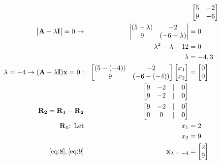 \documentclass{article}
\begin{document}
\begin{align}
    \label{eq:1}
    && &\text{ } \begin{bmatrix}
    5 & -2\\
    9 & -6
    \end{bmatrix}
    \\
    \label{eq:2}
    \begin{vmatrix} \textbf{A} - \lambda\textbf{I}\end{vmatrix}=0 \rightarrow && \begin{vmatrix}
    (5-\lambda) & -2\\
    9 & (-6-\lambda)
    \end{vmatrix} &= 0
    \\
    \label{eq:3}
    && \lambda ^2 -\lambda -12 &= 0
    \\
    \label{eq:4}
    && \lambda &= -4, 3
    \\
    \label{eq:5}
    \lambda = -4 \rightarrow (\textbf{A} - \lambda\textbf{I})\textbf{x}=0: &&
    \begin{bmatrix}
    (5-(-4)) & -2\\
    9 & (-6-(-4))
    \end{bmatrix}\begin{bmatrix}
    x_1\\x_2
    \end{bmatrix} &= \begin{bmatrix}
    0\\0
    \end{bmatrix}
    \\
    \label{eq:6}
    && \begin{bmatrix}
    9 & -2 &|& 0\\
    9 & -2 &|& 0
    \end{bmatrix}
    \\
    \label{eq:7}
    \textbf{R\textsubscript{2}} = \textbf{R\textsubscript{1}} - \textbf{R\textsubscript{2}} && \begin{bmatrix}
    9 & -2 &|& 0\\
    0 & 0 &|& 0
    \end{bmatrix}
    \\
    \label{eq:8}
    \textbf{R\textsubscript{1}} \text{:  Let} && x_1 &= 2
    \\
    \label{eq:9}
    && x_2 &= 9
    \\
    \label{eq:10}
    \eqref{eq:8}, \eqref{eq:9} && \textbf{x\textsubscript{$\lambda=-4$}} &= \begin{bmatrix}
    2\\9

\end{bmatrix}
\end{align}
\end{document}

